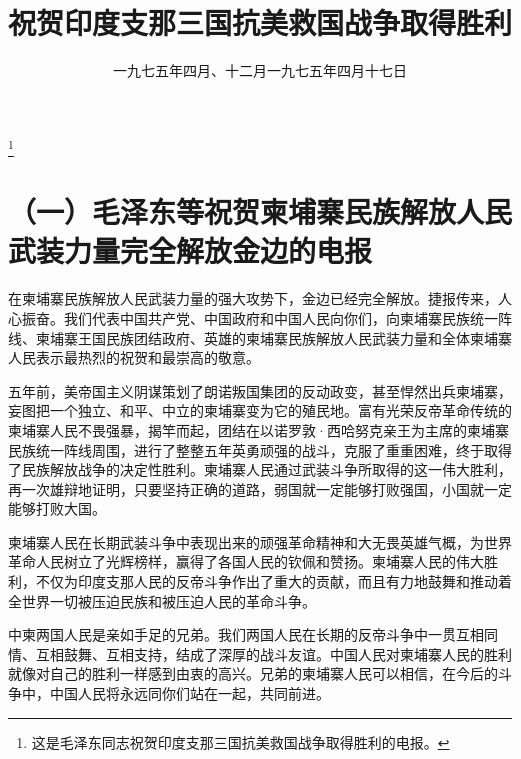 
\title{祝贺印度支那三国抗美救国战争取得胜利}
\date{一九七五年四月、十二月}
\thanks{这是毛泽东同志祝贺印度支那三国抗美救国战争取得胜利的电报。}
\maketitle


\date{一九七五年四月十七日}
\section*{（一）毛泽东等祝贺柬埔寨民族解放人民武装力量完全解放金边的电报}










在柬埔寨民族解放人民武装力量的强大攻势下，金边已经完全解放。捷报传来，人心振奋。我们代表中国共产党、中国政府和中国人民向你们，向柬埔寨民族统一阵线、柬埔寨王国民族团结政府、英雄的柬埔寨民族解放人民武装力量和全体柬埔寨人民表示最热烈的祝贺和最崇高的敬意。

五年前，美帝国主义阴谋策划了朗诺叛国集团的反动政变，甚至悍然出兵柬埔寨，妄图把一个独立、和平、中立的柬埔寨变为它的殖民地。富有光荣反帝革命传统的柬埔寨人民不畏强暴，揭竿而起，团结在以诺罗敦·西哈努克亲王为主席的柬埔寨民族统一阵线周围，进行了整整五年英勇顽强的战斗，克服了重重困难，终于取得了民族解放战争的决定性胜利。柬埔寨人民通过武装斗争所取得的这一伟大胜利，再一次雄辩地证明，只要坚持正确的道路，弱国就一定能够打败强国，小国就一定能够打败大国。

柬埔寨人民在长期武装斗争中表现出来的顽强革命精神和大无畏英雄气概，为世界革命人民树立了光辉榜样，赢得了各国人民的钦佩和赞扬。柬埔寨人民的伟大胜利，不仅为印度支那人民的反帝斗争作出了重大的贡献，而且有力地鼓舞和推动着全世界一切被压迫民族和被压迫人民的革命斗争。

中柬两国人民是亲如手足的兄弟。我们两国人民在长期的反帝斗争中一贯互相同情、互相鼓舞、互相支持，结成了深厚的战斗友谊。中国人民对柬埔寨人民的胜利就像对自己的胜利一样感到由衷的高兴。兄弟的柬埔寨人民可以相信，在今后的斗争中，中国人民将永远同你们站在一起，共同前进。

